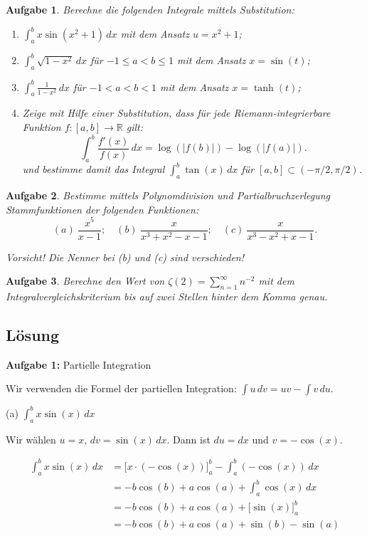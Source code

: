 \documentclass{article}
\newtheorem{prob}{Aufgabe}
\begin{document}
\begin{prob}
Berechne die folgenden Integrale mittels Substitution:
\begin{enumerate}
\item $\int_a^b x\sin(x^2+1)\,dx$ mit dem Ansatz $u=x^2+1$;
\item $\int_a^b \sqrt{1-x^2}\,dx$ f\"ur $-1\leq a<b\leq1$ mit dem Ansatz $x=\sin(t)$;
\item $\int_a^b\frac{1}{1-x^2}\,dx$ f\"ur $-1<a<b<1$ mit dem Ansatz $x=\tanh(t)$;
\item Zeige mit Hilfe einer Substitution, dass für jede Riemann-integrierbare Funktion $f:[a,b]\to\mathbb{R}$ gilt:
$$
\int_a^b\frac{f'(x)}{f(x)}\,dx = \log(|f(b)|)- \log(|f(a)|).
$$
 und bestimme damit das Integral $\int_a^b\tan(x)\,dx$ für $[a,b]\subset(-\pi/2,\pi/2)$.
\end{enumerate} 
\end{prob}

\begin{prob}
Bestimme mittels Polynomdivision und Partialbruchzerlegung Stammfunktionen der folgenden Funktionen:
$$
(a)\ \frac{x^5}{x-1};\quad
(b)\ \frac{x}{x^3+x^2-x-1};\quad
(c)\ \frac{x}{x^3-x^2+x-1}.
$$

\textit{Vorsicht!} Die Nenner bei (b) und (c) sind verschieden!
\end{prob}

\begin{prob}
Berechne den Wert von $\zeta(2)=\sum_{n=1}^\infty n^{-2}$ mit dem
Integralvergleichskriterium bis auf zwei Stellen hinter dem Komma genau.
\end{prob}

\subsection*{Lösung}

\textbf{Aufgabe 1:} Partielle Integration

Wir verwenden die Formel der partiellen Integration: $\int u\,dv = uv - \int v\,du$.

(a) $\int_a^b x\sin(x)\,dx$

Wir wählen $u = x$, $dv = \sin(x)\,dx$. Dann ist $du = dx$ und $v = -\cos(x)$.

\begin{align}
\int_a^b x\sin(x)\,dx &= \Big[x \cdot (-\cos(x))\Big]_a^b - \int_a^b (-\cos(x))\,dx \\
&= -b\cos(b) + a\cos(a) + \int_a^b \cos(x)\,dx \\
&= -b\cos(b) + a\cos(a) + \Big[\sin(x)\Big]_a^b \\
&= -b\cos(b) + a\cos(a) + \sin(b) - \sin(a)
\end{align}
\end{document}
